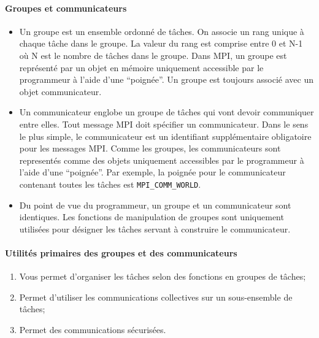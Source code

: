 \documentclass[11pt,a4paper]{article}
\begin{document}
\paragraph{Groupes et communicateurs}
\begin{itemize}
\item Un groupe est un ensemble ordonné de tâches. On associe un rang unique à chaque tâche dans le groupe. La valeur du rang est comprise entre 0 et N-1 où N est le nombre de tâches dans le groupe. Dans MPI, un groupe est représenté par un objet en mémoire uniquement accessible par le programmeur à l'aide d'une ``poignée''. Un groupe est toujours associé avec un objet communicateur.

\item Un communicateur englobe un groupe de tâches qui vont devoir communiquer entre elles. Tout message MPI doit spécifier un communicateur. Dans le sens le plus simple, le communicateur est un
identifiant supplémentaire obligatoire pour les messages MPI. Comme les groupes, les communicateurs sont representés comme des objets uniquement accessibles par le programmeur
à l'aide d'une ``poignée''. Par exemple, la poignée pour le communicateur contenant toutes les tâches est \texttt{MPI\_COMM\_WORLD}.

\item Du point de vue du programmeur, un groupe et un communicateur sont identiques. Les fonctions de manipulation de groupes sont uniquement utilisées pour désigner les tâches servant à construire le communicateur.

\end{itemize}

\paragraph{Utilités primaires des groupes et des communicateurs}

\begin{enumerate}
\item Vous permet d'organiser les tâches selon des fonctions en groupes de tâches;
\item Permet d'utiliser les communications collectives sur un sous-ensemble de tâches;
\item Permet des communications sécurisées.
\end{enumerate}
\end{document}
